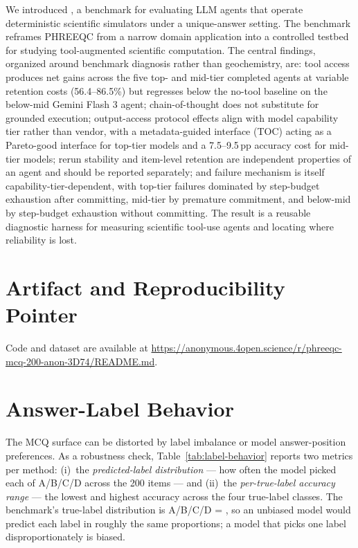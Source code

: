 \documentclass{article}
\begin{document}
We introduced \BenchName, a benchmark for evaluating LLM agents that operate deterministic scientific simulators under a unique-answer setting. The benchmark reframes PHREEQC from a narrow domain application into a controlled testbed for studying tool-augmented scientific computation. The central findings, organized around benchmark diagnosis rather than geochemistry, are: tool access produces net gains across the five top- and mid-tier completed agents at variable retention costs (56.4--86.5\%) but regresses below the no-tool baseline on the below-mid Gemini Flash 3 agent; chain-of-thought does not substitute for grounded execution; output-access protocol effects align with model capability tier rather than vendor, with a metadata-guided interface (TOC) acting as a Pareto-good interface for top-tier models and a 7.5--9.5\,pp accuracy cost for mid-tier models; rerun stability and item-level retention are independent properties of an agent and should be reported separately; and failure mechanism is itself capability-tier-dependent, with top-tier failures dominated by step-budget exhaustion after committing, mid-tier by premature commitment, and below-mid by step-budget exhaustion without committing. The result is a reusable diagnostic harness for measuring scientific tool-use agents and locating where reliability is lost.




\newpage
\appendix

\section{Artifact and Reproducibility Pointer}
\label{sec:appendix-artifact}

Code and dataset are available at \url{https://anonymous.4open.science/r/phreeqc-mcq-200-anon-3D74/README.md}.

\section{Answer-Label Behavior}
\label{sec:appendix-label-behavior}

The MCQ surface can be distorted by label imbalance or model answer-position preferences. As a robustness check, Table~\ref{tab:label-behavior} reports two metrics per method: (i)~the \emph{predicted-label distribution} --- how often the model picked each of A/B/C/D across the 200 items --- and (ii)~the \emph{per-true-label accuracy range} --- the lowest and highest accuracy across the four true-label classes. The benchmark's true-label distribution is A/B/C/D = \BenchTruthCounts, so an unbiased model would predict each label in roughly the same proportions; a model that picks one label disproportionately is biased.
\end{document}
